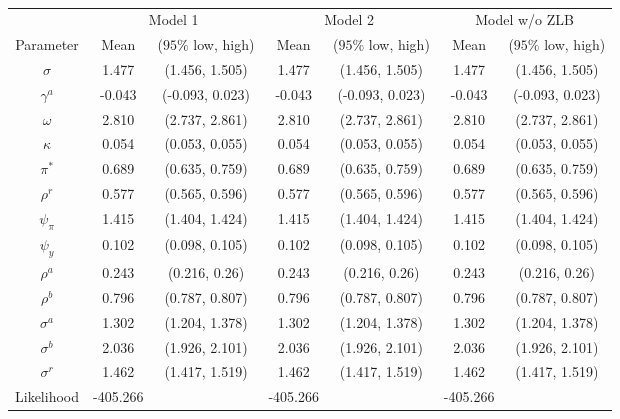 \begin{table}[bp]
\begin{center}
\begin{tabular}{ccccccc} 
 & \multicolumn{2}{c}{Model 1} & \multicolumn{2}{c}{Model 2} & \multicolumn{2}{c}{Model w/o ZLB} \\
Parameter & Mean & \scriptsize{ ($95\%$ low, high)} & Mean & \scriptsize{ ($95\%$ low, high)} & Mean & \scriptsize{ ($95\%$ low, high)} \\\hline
$\sigma$ & 1.477 & \tiny{ (1.456, 1.505)} & 1.477 & \tiny{ (1.456, 1.505)} & 1.477 & \tiny{ (1.456, 1.505)} \\
$\gamma^a$ & -0.043 & \tiny{ (-0.093, 0.023)} & -0.043 & \tiny{ (-0.093, 0.023)} & -0.043 & \tiny{ (-0.093, 0.023)} \\
$\omega$ & 2.810 & \tiny{ (2.737, 2.861)} & 2.810 & \tiny{ (2.737, 2.861)} & 2.810 & \tiny{ (2.737, 2.861)} \\
$\kappa$ & 0.054 & \tiny{ (0.053, 0.055)} & 0.054 & \tiny{ (0.053, 0.055)} & 0.054 & \tiny{ (0.053, 0.055)} \\
$\pi^*$ & 0.689 & \tiny{ (0.635, 0.759)} & 0.689 & \tiny{ (0.635, 0.759)} & 0.689 & \tiny{ (0.635, 0.759)} \\
$\rho^r$ & 0.577 & \tiny{ (0.565, 0.596)} & 0.577 & \tiny{ (0.565, 0.596)} & 0.577 & \tiny{ (0.565, 0.596)} \\
$\psi_{\pi}$ & 1.415 & \tiny{ (1.404, 1.424)} & 1.415 & \tiny{ (1.404, 1.424)} & 1.415 & \tiny{ (1.404, 1.424)} \\
$\psi_y$ & 0.102 & \tiny{ (0.098, 0.105)} & 0.102 & \tiny{ (0.098, 0.105)} & 0.102 & \tiny{ (0.098, 0.105)} \\
$\rho^a$ & 0.243 & \tiny{ (0.216, 0.26)} & 0.243 & \tiny{ (0.216, 0.26)} & 0.243 & \tiny{ (0.216, 0.26)} \\
$\rho^b$ & 0.796 & \tiny{ (0.787, 0.807)} & 0.796 & \tiny{ (0.787, 0.807)} & 0.796 & \tiny{ (0.787, 0.807)} \\
$\sigma^a$ & 1.302 & \tiny{ (1.204, 1.378)} & 1.302 & \tiny{ (1.204, 1.378)} & 1.302 & \tiny{ (1.204, 1.378)} \\
$\sigma^b$ & 2.036 & \tiny{ (1.926, 2.101)} & 2.036 & \tiny{ (1.926, 2.101)} & 2.036 & \tiny{ (1.926, 2.101)} \\
$\sigma^r$ & 1.462 & \tiny{ (1.417, 1.519)} & 1.462 & \tiny{ (1.417, 1.519)} & 1.462 & \tiny{ (1.417, 1.519)} \\\hline
Likelihood & -405.266 &  & -405.266 &  & -405.266 &  \\
\end{tabular}
\end{center}
\caption{}
\label{}
\end{table}
